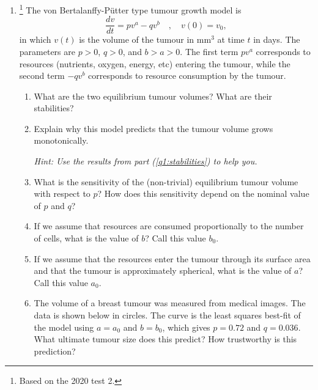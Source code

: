 \begin{enumerate}


	\item \label{q1}\footnote{Based on the 2020 test 2.} 
	The von Bertalanffy-P\"utter type tumour growth model is
	\[
	\frac{dv}{dt} = pv^a - qv^b \quad , \quad v(0) = v_0,
	\]
	in which $v(t)$ is the volume of the tumour in mm$^3$ at time $t$ in days. 
	The parameters are $p > 0$, $q > 0$, and $b > a > 0$. 
	The first term $pv^a$ corresponds to resources (nutrients, oxygen, energy, etc) entering the tumour, while the second term $-qv^b$ corresponds to resource consumption by the tumour.
	
	\begin{enumerate}
		\item \label{q1:stabilities} What are the two equilibrium tumour volumes? What are their stabilities?
		\item Explain why this model predicts that the tumour volume grows monotonically.
		
		\textit{Hint: Use the results from part (\ref{q1:stabilities}) to help you.}
		
		\item What is the sensitivity of the (non-trivial) equilibrium tumour volume with respect to $p$? How does this sensitivity depend on the nominal value of $p$ and $q$?
		
		\item If we assume that resources are consumed proportionally to the number of cells, what is the value of $b$? Call this value $b_0$.

		\item If we assume that the resources enter the tumour through its surface area and that the tumour is approximately spherical, what is the value of $a$? Call this value $a_0$.

		\item The volume of a breast tumour was measured from medical images. The data is shown below in circles. The curve is the least squares best-fit of the model using $a = a_0$ and $b = b_0$, which gives $p = 0.72$ and $q = 0.036$. 
		What ultimate tumour size does this predict? How trustworthy is this prediction?


\end{enumerate}
\end{enumerate}
